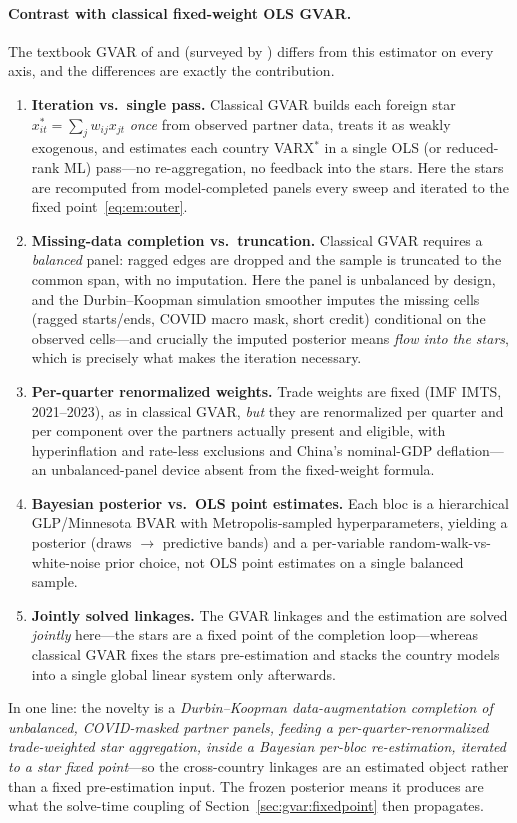 \documentclass[11pt]{article}
\theoremstyle{definition}
\theoremstyle{remark}
\begin{document}
\paragraph{Contrast with classical fixed-weight OLS GVAR.} The textbook GVAR of
\citet{PesaranSchuermannWeiner2004} and \citet{DeesDiMauroPesaranSmith2007}
(surveyed by \citealp{ChudikPesaran2016}) differs from this estimator on every
axis, and the differences are exactly the contribution.
\begin{enumerate}[label=(\arabic*)]
  \item \textbf{Iteration vs.\ single pass.} Classical GVAR builds each foreign
    star $x^{*}_{it}=\sum_j w_{ij}x_{jt}$ \emph{once} from observed partner data,
    treats it as weakly exogenous, and estimates each country VARX$^{*}$ in a
    single OLS (or reduced-rank ML) pass---no re-aggregation, no feedback into the
    stars. Here the stars are recomputed from model-completed panels every sweep
    and iterated to the fixed point~\eqref{eq:em:outer}.
  \item \textbf{Missing-data completion vs.\ truncation.} Classical GVAR requires
    a \emph{balanced} panel: ragged edges are dropped and the sample is truncated
    to the common span, with no imputation. Here the panel is unbalanced by
    design, and the Durbin--Koopman simulation smoother imputes the missing cells
    (ragged starts/ends, COVID macro mask, short credit) conditional on the
    observed cells---and crucially the imputed posterior means \emph{flow into the
    stars}, which is precisely what makes the iteration necessary.
  \item \textbf{Per-quarter renormalized weights.} Trade weights are fixed (IMF
    IMTS, 2021--2023), as in classical GVAR, \emph{but} they are renormalized per
    quarter and per component over the partners actually present and eligible,
    with hyperinflation and rate-less exclusions and China's nominal-GDP
    deflation---an unbalanced-panel device absent from the fixed-weight formula.
  \item \textbf{Bayesian posterior vs.\ OLS point estimates.} Each bloc is a
    hierarchical GLP/Minnesota BVAR with Metropolis-sampled hyperparameters,
    yielding a posterior (draws $\to$ predictive bands) and a per-variable
    random-walk-vs-white-noise prior choice, not OLS point estimates on a single
    balanced sample.
  \item \textbf{Jointly solved linkages.} The GVAR linkages and the estimation are
    solved \emph{jointly} here---the stars are a fixed point of the completion
    loop---whereas classical GVAR fixes the stars pre-estimation and stacks the
    country models into a single global linear system only afterwards.
\end{enumerate}
In one line: the novelty is a \emph{Durbin--Koopman data-augmentation completion
of unbalanced, COVID-masked partner panels, feeding a per-quarter-renormalized
trade-weighted star aggregation, inside a Bayesian per-bloc re-estimation,
iterated to a star fixed point}---so the cross-country linkages are an estimated
object rather than a fixed pre-estimation input. The frozen posterior means it
produces are what the solve-time coupling of
Section~\ref{sec:gvar:fixedpoint} then propagates.
\end{document}
